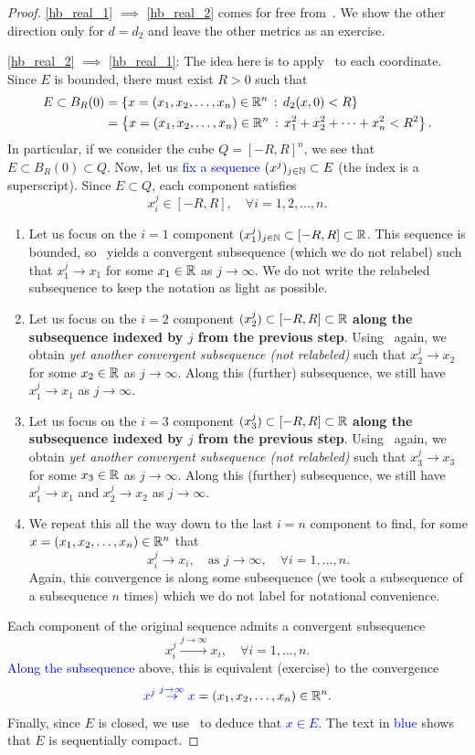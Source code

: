 \begin{proof}
\ref{hb_real_1} $\implies$ \ref{hb_real_2} comes for free from~. We show the other direction only for $d=d_2$ and leave the other metrics as an exercise.

\ref{hb_real_2} $\implies$ \ref{hb_real_1}: The idea here is to apply~ to each coordinate. Since $E$ is bounded, there must exist $R>0$ such that
\begin{align*}
E \subset B_R(0) &= \left\{
x=(x_1,x_2,\dots, x_n)\in \mathbb{R}^n \, : \, d_2(x,0)<R
\right\} 	\\
&= \left\{
x=(x_1,x_2,\dots, x_n)\in \mathbb{R}^n \, : \, x_1^2 + x_2^2 + \dots+ x_n^2 < R^2
\right\}.
\end{align*}
In particular, if we consider the cube $Q = [-R,R]^n$, we see that $E\subset B_R(0) \subset Q$. Now, let us \textcolor{blue}{fix a sequence $(x^j)_{j\in \mathbb{N}}\subset E$} (the index is a superscript). Since $E\subset Q$, each component satisfies
\[
x_i^j \in [-R,R],\quad \forall i=1,2,\dots, n.
\]
\begin{enumerate}
	\item Let us focus on the $i=1$ component $(x_1^j)_{j\in\mathbb{N}}\subset [-R,R]\subset \mathbb{R}$. This sequence is bounded, so~ yields a convergent subsequence (which we do not relabel) such that $x_1^j \to x_1$ for some $x_1\in \mathbb{R}$ as $j\to \infty$. We do not write the relabeled subsequence to keep the notation as light as possible.
	\item Let us focus on the $i=2$ component $(x_2^j)\subset [-R,R]\subset \mathbb{R}$ \textbf{along the subsequence indexed by $j$ from the previous step}. Using~ again, we obtain \textit{yet another convergent subsequence (not relabeled)} such that $x_2^j \to x_2$ for some $x_2 \in \mathbb{R}$ as $j\to \infty$. Along this (further) subsequence, we still have $x_1^j \to x_1$ as $j\to \infty$.
	\item Let us focus on the $i=3$ component $(x_3^j)\subset [-R,R]\subset \mathbb{R}$ \textbf{along the subsequence indexed by $j$ from the previous step}. Using~ again, we obtain \textit{yet another convergent subsequence (not relabeled)} such that $x_3^j \to x_3$ for some $x_3 \in \mathbb{R}$ as $j\to \infty$. Along this (further) subsequence, we still have $x_1^j\to x_1$ and $x_2^j \to x_2$ as $j\to \infty$.
	\item We repeat this all the way down to the last $i=n$ component to find, for some $x = (x_1,x_2,\dots, x_n)\in \mathbb{R}^n$ that
	\[
	x_i^j \to x_i,\quad\text{as }j\to \infty,\quad \forall i=1,\dots, n.
	\]
	Again, this convergence is along some subsequence (we took a subsequence of a subsequence $n$ times) which we do not label for notational convenience.
\end{enumerate}
Each component of the original sequence admits a convergent subsequence
\[
x_i^j\overset{j\to \infty}{\to} x_i,\quad \forall i=1,\dots, n.
\]
\textcolor{blue}{Along the subsequence} above, this is equivalent (exercise) to the convergence
\[
\textcolor{blue}{x^j \overset{j\to \infty}{\to} x} = (x_1,x_2,\dots, x_n)\in \mathbb{R}^n.
\]
Finally, since $E$ is closed, we use~ to deduce that \textcolor{blue}{$x\in E$.} The text in \textcolor{blue}{blue} shows that $E$ is sequentially compact.
\end{proof}
